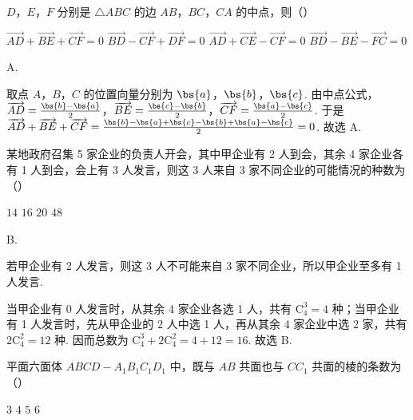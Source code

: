 \begin{problem}
\(D\)，\(E\)，\(F\) 分别是 \(\triangle ABC\) 的边 \(AB\)，\(BC\)，\(CA\) 的中点，则（\quad）

\choices
    {\(\overrightarrow{AD} +\overrightarrow{BE} +\overrightarrow{CF} = 0\)}
    {\(\overrightarrow{BD} -\overrightarrow{CF} +\overrightarrow{DF} = 0\)}
    {\(\overrightarrow{AD} +\overrightarrow{CE} -\overrightarrow{CF} = 0\)}
    {\(\overrightarrow{BD} -\overrightarrow{BE} -\overrightarrow{FC} = 0\)}
\end{problem}

\begin{answer}
A.
\end{answer}

\begin{solution}
取点 \(A\)，\(B\)，\(C\) 的位置向量分别为 \(\bs{a}\)，\(\bs{b}\)，\(\bs{c}\). 由中点公式，\(\overrightarrow{AD}=\frac{\bs{b}-\bs{a}}{2}\)，\(\overrightarrow{BE}=\frac{\bs{c}-\bs{b}}{2}\)，\(\overrightarrow{CF}=\frac{\bs{a}-\bs{c}}{2}\).
于是 \(\overrightarrow{AD}+\overrightarrow{BE}+\overrightarrow{CF}=\frac{\bs{b}-\bs{a}+\bs{c}-\bs{b}+\bs{a}-\bs{c}}{2}=0\).
故选 A.
\end{solution}

\begin{problem}
某地政府召集 5 家企业的负责人开会，其中甲企业有 2 人到会，其余 4 家企业各有 1 人到会，会上有 3 人发言，则这 3 人来自 3 家不同企业的可能情况的种数为（\quad）

\choices
    {\(14\)}
    {\(16\)}
    {\(20\)}
    {\(48\)}
\end{problem}

\begin{answer}
B.
\end{answer}

\begin{solution}
若甲企业有 2 人发言，则这 3 人不可能来自 3 家不同企业，所以甲企业至多有 1 人发言.

当甲企业有 0 人发言时，从其余 4 家企业各选 1 人，共有 \(\mathrm C_4^3=4\) 种；当甲企业有 1 人发言时，先从甲企业的 2 人中选 1 人，再从其余 4 家企业中选 2 家，共有 \(2\mathrm C_4^2=12\) 种. 因而总数为 \(\mathrm C_4^3+2\mathrm C_4^2=4+12=16\).
故选 B.
\end{solution}

\begin{problem}
平面六面体 \(ABCD - A_{1}B_{1}C_{1}D_{1}\) 中，既与 \(AB\) 共面也与 \(CC_{1}\) 共面的棱的条数为（\quad）

\choices
    {\(3\)}
    {\(4\)}
    {\(5\)}
    {\(6\)}
\end{problem}

